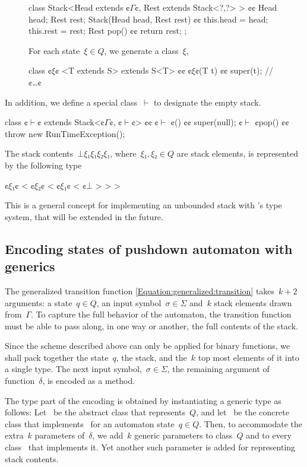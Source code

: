 \begin{figure}[H]
\begin{JAVA}
class Stack<Head extends ¢$Γ$¢, Rest extends Stack<?,?> > {¢¢
  Head head;
  Rest rest;
  Stack(Head head, Rest rest) {¢¢ this.head = head; this.rest = rest;}
  Rest pop() {¢¢ return rest; };
}
\end{JAVA}
For each state~$ξ∈Q$, we generate a \Java class~$ξ$,
\begin{JAVA}
class ¢$ξ$¢ <T extends S> extends S<T> {¢¢
  ¢$ξ$¢(T t) {¢¢ super(t); }
  // ¢…¢
}
\end{JAVA}
\end{figure}
In addition, we define a special class~$\vdash$ to designate the empty stack.
\begin{JAVA}
class ¢$\vdash$¢ extends Stack<¢$Γ$¢, ¢$\vdash$¢> {¢¢
  ¢$\vdash$ ¢() {¢¢ super(null); }
  ¢$\vdash$ ¢pop() {¢¢ throw new RunTimeException(); }
}
\end{JAVA}
The stack contents~$⊥ξ₁ξ₁ξ₂ξ₁$,
where~$ξ₁,ξ₂∈Q$ are stack elements,
is represented by the following type
\begin{JAVA}
  ¢$ξ₁$¢ < ¢$ξ₂$¢ < ¢$ξ₁$¢ < ¢$⊥$ > > >
\end{JAVA}
This is a general concept for implementing an unbounded stack with \Java's type system,
that will be extended in the future.


\subsection{Encoding states of pushdown automaton with \Java generics}
The generalized transition function \cref{Equation:generalized:transition}
  takes~$k+2$ arguments: a state~$q∈Q$, an input symbol~$σ∈Σ$
    and~$k$ stack elements drawn from~$Γ$.
To capture the full behavior of the automaton, the transition function
  must be able to pass along, in one way or another, the full contents of the stack.

Since the scheme described above can only be applied for binary functions,
  we shall pack together the state~$q$, the stack, and the~$k$ top most
  elements of it into a single type.
The next input symbol,~$σ∈Σ$, the remaining argument of function~$δ$,
  is encoded as a method.

The type part of the encoding is obtained by instantiating a generic type as follows:
Let~ be the abstract class that represents~$Q$, and let~ be the concrete class that
  implements~ for an automaton state~$q∈Q$.
Then, to accommodate the extra~$k$ parameters of~$δ$, we add~$k$ generic parameters
  to class~$Q$ and to every class~ that implements it.
Yet another such parameter is added for representing stack contents.

